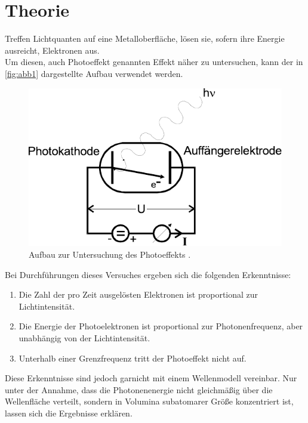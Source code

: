 \section{Theorie}
\label{sec:theorie}

Treffen Lichtquanten auf eine Metalloberfläche,
lösen sie, sofern ihre Energie ausreicht, Elektronen aus. \\

Um diesen, auch Photoeffekt genannten Effekt näher zu untersuchen,
kann der in \autoref{fig:abb1} dargestellte Aufbau verwendet werden.

\begin{figure}[H]
    \centering
    \includegraphics{figures/Abb1.pdf}
    \caption{Aufbau zur Untersuchung des Photoeffekts \cite{ap10}.}
    \label{fig:abb1}
\end{figure}

Bei Durchführungen dieses Versuches ergeben sich die folgenden Erkenntnisse:

\begin{enumerate}
    \item Die Zahl der pro Zeit ausgelösten Elektronen ist proportional zur Lichtintensität.
    \item Die Energie der Photoelektronen ist proportional zur Photonenfrequenz, aber unabhängig von der Lichtintensität.
    \item Unterhalb einer Grenzfrequenz tritt der Photoeffekt nicht auf.
\end{enumerate}

Diese Erkenntnisse sind jedoch garnicht mit einem Wellenmodell vereinbar.
Nur unter der Annahme, dass die Photonenenergie nicht gleichmäßig über die Wellenfläche verteilt,
sondern in Volumina subatomarer Größe konzentriert ist, lassen sich die Ergebnisse erklären. \\

